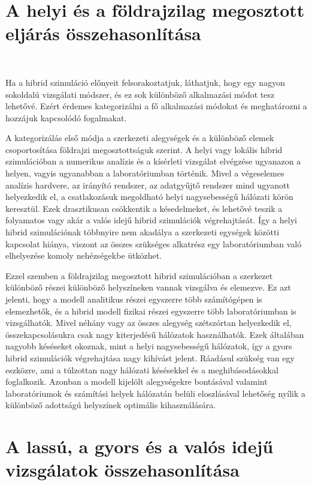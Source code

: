 \section{A helyi és a földrajzilag megosztott eljárás összehasonlítása}

{\ }

Ha a hibrid szimuláció előnyeit felsorakoztatjuk, láthatjuk, hogy  egy nagyon sokoldalú vizsgálati módszer, és ez sok különböző alkalmazási módot tesz lehetővé. Ezért érdemes kategorizálni a fő alkalmazási módokat és meghatározni a hozzájuk  kapcsolódó fogalmakat.

A kategorizálás első módja a szerkezeti alegységek és a különböző elemek  csoportosítása földrajzi megosztottságuk szerint. A helyi vagy lokális hibrid szimulációban a numerikus analízis és a kísérleti vizsgálat elvégzése ugyanazon a helyen, vagyis ugyanabban a laboratóriumban történik.  Mivel a végeselemes analízis  hardvere, az irányító rendszer, az adatgyűjtő rendszer mind ugyanott helyezkedik el, a csatlakozásuk megoldható helyi nagysebességű hálózati körön keresztül. Ezek drasztikusan csökkentik a késedelmeket, és lehetővé teszik a folyamatos vagy akár a valós idejű hibrid szimulációk végrehajtását. Így a helyi hibrid szimulációnak többnyire nem akadálya a szerkezeti egységek közötti kapcsolat hiánya, viszont az összes szükséges alkatrész egy laboratóriumban való elhelyezése komoly nehézségekbe ütközhet.

Ezzel szemben a földrajzilag megosztott hibrid szimulációban a szerkezet különböző részei különböző helyszíneken vannak vizsgálva és  elemezve. Ez azt jelenti, hogy a modell analitikus részei egyszerre több számítógépen is elemezhetők, és  a hibrid modell fizikai részei egyszerre több laboratóriumban is vizsgálhatók. Mivel néhány vagy az összes alegység szétszórtan helyezkedik el,  összekapcsolásukra csak nagy kiterjedésű hálózatok használhatók. Ezek általában nagyobb késéseket okoznak, mint a helyi nagysebességű hálózatok, így a gyors hibrid szimulációk végrehajtása  nagy kihívást jelent. Ráadásul szükség van egy eszközre, ami a túlzottan nagy hálózati késésekkel és a meghibásodásokkal foglalkozik. Azonban a modell  kijelölt alegységekre bontásával valamint laboratóriumok és számítási helyek hálózatán belüli eloszlásával  lehetőség nyílik a különböző adottságú helyszínek optimális kihasználására. 

\section{A lassú, a gyors és a valós idejű vizsgálatok összehasonlítása}

